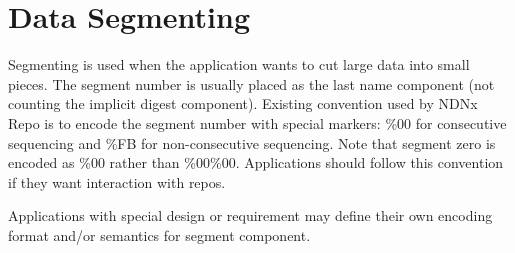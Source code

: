 \section{Data Segmenting}

Segmenting is used when the application wants to cut large data into small pieces. The segment number is usually placed as the last name component (not counting the implicit digest component). Existing convention used by NDNx Repo is to encode the segment number with special markers: \%00 for consecutive sequencing and \%FB for non-consecutive sequencing. Note that segment zero is encoded as \%00 rather than \%00\%00. Applications should follow this convention if they want interaction with repos.

Applications with special design or requirement may define their own encoding format and/or semantics for segment component.


